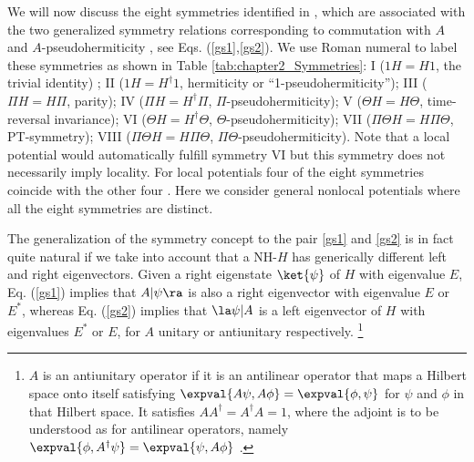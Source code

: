 We will now discuss the eight symmetries identified in \cite{Ruschhaupt2017},
which are associated with the two generalized symmetry relations corresponding to commutation with $A$ and $A$-pseudohermiticity \cite{Mostafazadeh2002}, see Eqs. (\ref{gs1},\ref{gs2}).
%
%
We use Roman numeral to label these symmetries as shown in Table \ref{tab:chapter2_Symmetries}: I ($1H=H1$, the trivial identity)
; II ($1H=H^\dagger 1$, hermiticity or ``1-pseudohermiticity''); III ($\Pi H=H\Pi$, parity); IV ($\Pi H=H^\dagger \Pi$, $\Pi$-pseudohermiticity);  V ($\Theta H=H\Theta$, time-reversal invariance);  VI ($\Theta H=H^\dagger \Theta$, $\Theta$-pseudohermiticity);
VII ($\Pi\Theta H=H\Pi\Theta$, PT-symmetry); VIII ($\Pi\Theta H=H\Pi\Theta$, $\Pi\Theta$-pseudohermiticity).
Note that a local potential would automatically fulfill symmetry VI but this symmetry does not necessarily imply locality.
For local potentials four of the eight symmetries coincide with the other four \cite{Ruschhaupt2017}. Here we consider general nonlocal potentials where all the eight symmetries are distinct.


The generalization of the symmetry concept to the pair \eqref{gs1} and \eqref{gs2} is in fact quite natural if we take into account that a NH-$H$
has generically different left and right eigenvectors. Given a right eigenstate $\ket{\psi}$ of $H$ with eigenvalue $E$, Eq. (\ref{gs1}) implies that  $A|\psi\ra$ is also a right eigenvector with eigenvalue $E$ or $E^*$, whereas Eq. (\ref{gs2}) implies that $\la \psi|A$ is a left eigenvector of $H$ with eigenvalues $E^*$ or $E$,  for $A$ unitary or antiunitary respectively. \footnote{$A$ is an antiunitary operator if it is an antilinear operator that maps a Hilbert space onto itself satisfying $\expval{A \psi,A\phi}= \expval{\phi,\psi}$ for $\psi$ and $\phi$ in that Hilbert space. It  satisfies $AA^{\dagger}=A^\dagger A=1$, where the adjoint is to be understood as for antilinear operators, namely  $\expval{\phi,A^\dagger\psi} = \expval{\psi,A \phi}$ \cite{Muga2004}.}

